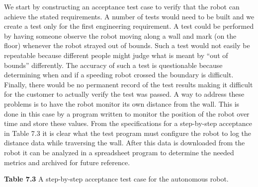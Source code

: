 We start by constructing an acceptance test case to verify that the
robot can achieve the stated requirements. A number of tests would need
to be built and we create a test only for the first engineering
requirement. A test could be performed by having someone observe the
robot moving along a wall and mark (on the floor) whenever the robot
strayed out of bounds. Such a test would not easily be repeatable
because different people might judge what is meant by ``out of bounds''
differently. The accuracy of such a test is questionable because
determining when and if a speeding robot crossed the boundary is
difficult. Finally, there would be no permanent record of the test
results making it difficult for the customer to actually verify the test
was passed. A way to address these problems is to have the robot monitor
its own distance from the wall. This is done in this case by a program
written to monitor the position of the robot over time and store these
values. From the specifications for a step-by-step acceptance in Table
7.3 it is clear what the test program must configure the robot to log
the distance data while traversing the wall. After this data is
downloaded from the robot it can be analyzed in a spreadsheet program to
determine the needed metrics and archived for future reference.

\textbf{Table 7.3} A step-by-step acceptance test case for the
autonomous robot.

